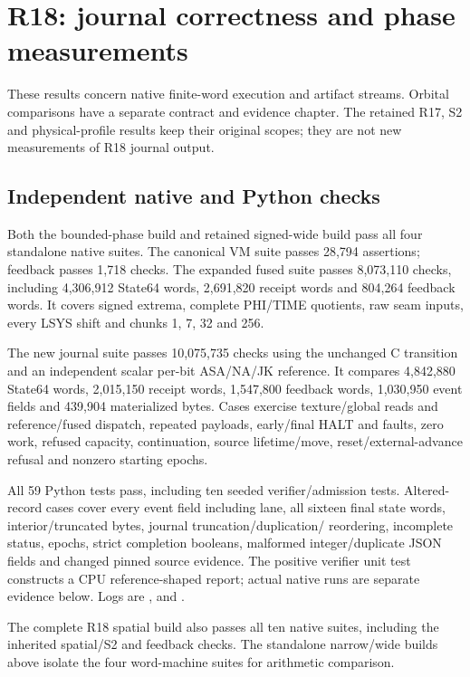 \section{R18: journal correctness and phase measurements}
\label{sec:r18-evidence}

These results concern native finite-word execution and artifact streams.
Orbital comparisons have a separate contract and evidence chapter. The
retained R17, S2 and physical-profile results keep their original scopes;
they are not new measurements of R18 journal output.

\subsection{Independent native and Python checks}
Both the bounded-phase build and retained signed-wide build pass all four
standalone native suites. The canonical VM suite passes 28,794 assertions;
feedback passes 1,718 checks. The expanded fused suite passes 8,073,110
checks, including 4,306,912 State64 words, 2,691,820 receipt words and
804,264 feedback words. It covers signed extrema, complete PHI/TIME
quotients, raw seam inputs, every LSYS shift and chunks 1, 7, 32 and 256.

The new journal suite passes 10,075,735 checks using the unchanged C
transition and an independent scalar per-bit ASA/NA/JK reference. It
compares 4,842,880 State64 words, 2,015,150 receipt words, 1,547,800
feedback words, 1,030,950 event fields and 439,904 materialized bytes.
Cases exercise texture/global reads and reference/fused dispatch, repeated
payloads, early/final HALT and faults, zero work, refused capacity,
continuation, source lifetime/move, reset/external-advance refusal and
nonzero starting epochs.

All 59 Python tests pass, including ten seeded verifier/admission tests.
Altered-record cases cover every event field including lane, all sixteen
final state words, interior/truncated bytes, journal truncation/duplication/
reordering, incomplete status, epochs, strict completion booleans,
malformed integer/duplicate JSON fields and changed pinned source evidence.
The positive verifier unit test constructs a CPU reference-shaped report;
actual native runs are separate evidence below. Logs are
, 
and .

The complete R18 spatial build also passes all ten native suites, including
the inherited spatial/S2 and feedback checks. The standalone narrow/wide
builds above isolate the four word-machine suites for arithmetic comparison.

